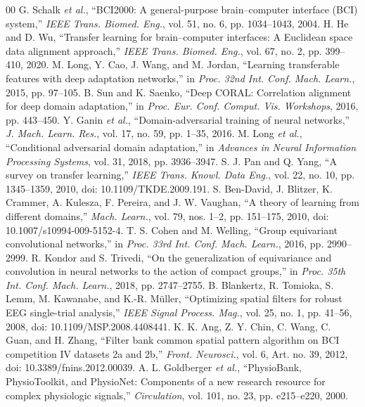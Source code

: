 \documentclass[preprint,12pt]{elsarticle}
\begin{document}
\begin{thebibliography}{00}
 G. Schalk \emph{et al.}, ``BCI2000: A general-purpose brain--computer interface (BCI) system,'' \emph{IEEE Trans. Biomed. Eng.}, vol. 51, no. 6, pp. 1034--1043, 2004.
 H. He and D. Wu, ``Transfer learning for brain--computer interfaces: A Euclidean space data alignment approach,'' \emph{IEEE Trans. Biomed. Eng.}, vol. 67, no. 2, pp. 399--410, 2020.
 M. Long, Y. Cao, J. Wang, and M. Jordan, ``Learning transferable features with deep adaptation networks,'' in \emph{Proc. 32nd Int. Conf. Mach. Learn.}, 2015, pp. 97--105.
 B. Sun and K. Saenko, ``Deep CORAL: Correlation alignment for deep domain adaptation,'' in \emph{Proc. Eur. Conf. Comput. Vis. Workshops}, 2016, pp. 443--450.
 Y. Ganin \emph{et al.}, ``Domain-adversarial training of neural networks,'' \emph{J. Mach. Learn. Res.}, vol. 17, no. 59, pp. 1--35, 2016.
 M. Long \emph{et al.}, ``Conditional adversarial domain adaptation,'' in \emph{Advances in Neural Information Processing Systems}, vol. 31, 2018, pp. 3936--3947.
 S. J. Pan and Q. Yang, ``A survey on transfer learning,'' \emph{IEEE Trans. Knowl. Data Eng.}, vol. 22, no. 10, pp. 1345--1359, 2010, doi: 10.1109/TKDE.2009.191.
 S. Ben-David, J. Blitzer, K. Crammer, A. Kulesza, F. Pereira, and J. W. Vaughan, ``A theory of learning from different domains,'' \emph{Mach. Learn.}, vol. 79, nos. 1--2, pp. 151--175, 2010, doi: 10.1007/s10994-009-5152-4.
 T. S. Cohen and M. Welling, ``Group equivariant convolutional networks,'' in \emph{Proc. 33rd Int. Conf. Mach. Learn.}, 2016, pp. 2990--2999.
 R. Kondor and S. Trivedi, ``On the generalization of equivariance and convolution in neural networks to the action of compact groups,'' in \emph{Proc. 35th Int. Conf. Mach. Learn.}, 2018, pp. 2747--2755.
 B. Blankertz, R. Tomioka, S. Lemm, M. Kawanabe, and K.-R. Müller, ``Optimizing spatial filters for robust EEG single-trial analysis,'' \emph{IEEE Signal Process. Mag.}, vol. 25, no. 1, pp. 41--56, 2008, doi: 10.1109/MSP.2008.4408441.
 K. K. Ang, Z. Y. Chin, C. Wang, C. Guan, and H. Zhang, ``Filter bank common spatial pattern algorithm on BCI competition IV datasets 2a and 2b,'' \emph{Front. Neurosci.}, vol. 6, Art. no. 39, 2012, doi: 10.3389/fnins.2012.00039.
 A. L. Goldberger \emph{et al.}, ``PhysioBank, PhysioToolkit, and PhysioNet: Components of a new research resource for complex physiologic signals,'' \emph{Circulation}, vol. 101, no. 23, pp. e215--e220, 2000.

\end{thebibliography}
\end{document}
